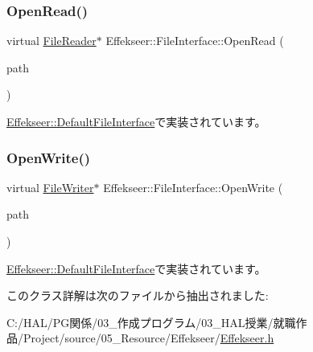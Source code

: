 \subsubsection{\texorpdfstring{Open\+Read()}{OpenRead()}}
{\footnotesize\ttfamily virtual \mbox{\hyperlink{class_effekseer_1_1_file_reader}{File\+Reader}}$\ast$ Effekseer\+::\+File\+Interface\+::\+Open\+Read (\begin{DoxyParamCaption}\item[{const \mbox{\hyperlink{_effekseer_8h_a50b026abea014b47854bcd835b3b6233}{E\+F\+K\+\_\+\+C\+H\+AR}} $\ast$}]{path }\end{DoxyParamCaption})\hspace{0.3cm}{\ttfamily [pure virtual]}}



\mbox{\hyperlink{class_effekseer_1_1_default_file_interface_a03d6224d1eb0124a21f42c578e447d51}{Effekseer\+::\+Default\+File\+Interface}}で実装されています。

\mbox{\label{class_effekseer_1_1_file_interface_a1e60cb81a5cae39b37e44570ef693d91}} 
\subsubsection{\texorpdfstring{Open\+Write()}{OpenWrite()}}
{\footnotesize\ttfamily virtual \mbox{\hyperlink{class_effekseer_1_1_file_writer}{File\+Writer}}$\ast$ Effekseer\+::\+File\+Interface\+::\+Open\+Write (\begin{DoxyParamCaption}\item[{const \mbox{\hyperlink{_effekseer_8h_a50b026abea014b47854bcd835b3b6233}{E\+F\+K\+\_\+\+C\+H\+AR}} $\ast$}]{path }\end{DoxyParamCaption})\hspace{0.3cm}{\ttfamily [pure virtual]}}



\mbox{\hyperlink{class_effekseer_1_1_default_file_interface_aecbcd4350ca701360dcea88a2c5f9c64}{Effekseer\+::\+Default\+File\+Interface}}で実装されています。



このクラス詳解は次のファイルから抽出されました\+:\begin{DoxyCompactItemize}
\item 
C\+:/\+H\+A\+L/\+P\+G関係/03\+\_\+作成プログラム/03\+\_\+\+H\+A\+L授業/就職作品/\+Project/source/05\+\_\+\+Resource/\+Effekseer/\mbox{\hyperlink{_effekseer_8h}{Effekseer.\+h}}\end{DoxyCompactItemize}
